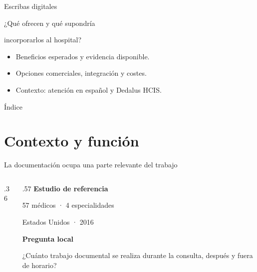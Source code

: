 \documentclass[aspectratio=169,10pt]{beamer}
\begin{document}
\begin{frame}[t]{Escribas digitales}
\par\vspace{4mm}
{\Large ¿Qué ofrecen y qué supondría\par incorporarlos al hospital?}
\par\vspace{6mm}
\begin{itemize}
\item Beneficios esperados y evidencia disponible.
\item Opciones comerciales, integración y costes.
\item Contexto: atención en español y Dedalus HCIS.
\end{itemize}
\end{frame}

\begin{frame}[t]{Índice}
\tableofcontents
\end{frame}

\section{Contexto y función}

\begin{frame}[t]{La documentación ocupa una parte relevante del trabajo}
\begin{columns}[T,onlytextwidth]
\begin{column}{.36\textwidth}
\end{column}
\begin{column}{.57\textwidth}
\textbf{Estudio de referencia}\par
57 médicos · 4 especialidades\par Estados Unidos · 2016
\par\vspace{3mm}
\textbf{Pregunta local}\par
¿Cuánto trabajo documental se realiza durante la consulta, después y fuera de horario?
\end{column}
\end{columns}
\end{frame}
\end{document}
